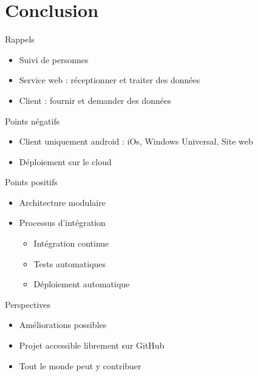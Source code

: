 \documentclass{beamer} %
\begin{document}
  \section{Conclusion}
  \begin{frame}{\secname}
      \begin{block}{Rappels}
        \begin{itemize}
          \item Suivi de personnes
          \item Service web : réceptionner et traiter des données
          \item Client : fournir et demander des données
        \end{itemize}
      \end{block}

      \pause

      \begin{alertblock}{Points négatifs}
        \begin{itemize}
          \item Client uniquement android : iOs, Windows Universal, Site web
          \item Déploiement sur le cloud
        \end{itemize}
      \end{alertblock}

  \end{frame}

  \begin{frame}{\secname}
    \begin{exampleblock}{Points positifs}
        \begin{itemize}
          \item Architecture modulaire
          \item Processus d'intégration
          \begin{itemize}
            \item Intégration continue
            \item Tests automatiques
            \item Déploiement automatique
          \end{itemize}
        \end{itemize}
      \end{exampleblock}

      \pause

      \begin{block}{Perspectives}
        \begin{itemize}
          \item Améliorations possibles
          \item Projet accessible librement sur GitHub
          \item Tout le monde peut y contribuer
        \end{itemize}
      \end{block}
  \end{frame}
\end{document}
